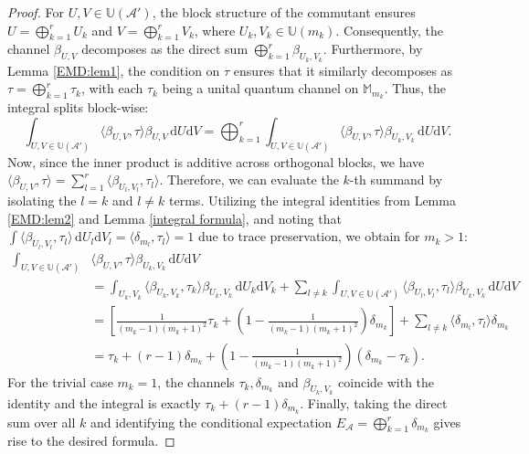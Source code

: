 \documentclass[11pt,reqno]{amsart}
\theoremstyle{definition}
\theoremstyle{plain}
\theoremstyle{remark}
\numberwithin{equation}{section}%
\begin{document}
    
    \begin{proof}
    	For $U, V \in \mathbb{U}(\mathcal{A}')$, the block structure of the commutant ensures $U = \bigoplus_{k=1}^r U_k$ and $V = \bigoplus_{k=1}^r V_k$, where $U_k, V_k \in \mathbb{U}(m_k)$. Consequently, the channel $\beta_{U,V}$ decomposes as the direct sum $\bigoplus_{k=1}^r \beta_{U_k,V_k}$. Furthermore, by Lemma \ref{EMD:lem1}, the condition on $\tau$ ensures that it similarly decomposes as $\tau = \bigoplus_{k=1}^r \tau_k$, with each $\tau_k$ being a unital quantum channel on $\mathbb{M}_{m_k}$. Thus, the integral splits block-wise:
    	\[
    	\int_{U,V \in \mathbb{U}(\mathcal{A}')} \langle \beta_{U,V}, \tau \rangle \beta_{U,V} \, \mathrm{d}U\mathrm{d}V = \bigoplus_{k=1}^r \int_{U,V \in \mathbb{U}(\mathcal{A}')} \langle \beta_{U,V}, \tau \rangle \beta_{U_k,V_k} \, \mathrm{d}U\mathrm{d}V.
    	\]
    	Now, since the inner product is additive across orthogonal blocks, we have $\langle \beta_{U,V}, \tau \rangle = \sum_{l=1}^r \langle \beta_{U_l,V_l}, \tau_l \rangle$. Therefore, we can evaluate the $k$-th summand by isolating the $l=k$ and $l \neq k$ terms. Utilizing the integral identities from Lemma \ref{EMD:lem2} and Lemma \ref{integral formula}, and noting that $\int \langle \beta_{U_l,V_l}, \tau_l \rangle \, \mathrm{d}U_l \mathrm{d}V_l = \langle \delta_{m_l}, \tau_l \rangle = 1$ due to trace preservation, we obtain for $m_k > 1$:
    	\begin{align*}
    		\int_{U,V \in \mathbb{U}(\mathcal{A}')}& \langle \beta_{U,V}, \tau \rangle \beta_{U_k,V_k} \, \mathrm{d}U \mathrm{d}V \\
    		&= \int_{U_k,V_k} \langle \beta_{U_k,V_k}, \tau_k \rangle \beta_{U_k,V_k} \, \mathrm{d}U_k \mathrm{d}V_k + \sum_{l \neq k} \int_{U,V \in \mathbb{U}(\mathcal{A}')} \langle \beta_{U_l,V_l}, \tau_l \rangle \beta_{U_k,V_k} \, \mathrm{d}U \mathrm{d}V \\
    		&= \left[ \frac{1}{(m_k-1)(m_k+1)^2} \tau_k + \left( 1 - \frac{1}{(m_k-1)(m_k+1)^2} \right) \delta_{m_k} \right] + \sum_{l \neq k} \langle \delta_{m_l}, \tau_l \rangle \delta_{m_k} \\
    		&= \tau_k + (r-1)\delta_{m_k} + \left( 1 - \frac{1}{(m_k-1)(m_k+1)^2} \right) (\delta_{m_k} - \tau_k).
    	\end{align*}
    	For the trivial case $m_k = 1$, the channels $\tau_k, \delta_{m_k}$ and $\beta_{U_k, V_k}$ coincide with the identity and the integral is exactly $\tau_k + (r-1)\delta_{m_k}$. Finally, taking the direct sum over all $k$ and identifying the conditional expectation $E_{\mathcal{A}} = \bigoplus_{k=1}^r \delta_{m_k}$ gives rise to the desired formula.
    \end{proof}
    
\end{document}
